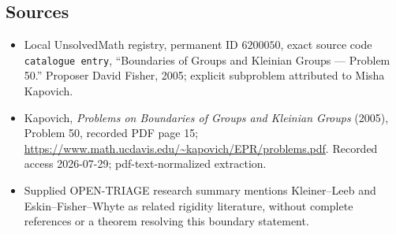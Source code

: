 \documentclass[11pt]{article}
\begin{document}
\subsection{Sources}
\begin{itemize}
\item Local UnsolvedMath registry, permanent ID \(6200050\), exact source code \texttt{catalogue entry}, ``Boundaries of Groups and Kleinian Groups --- Problem 50.'' Proposer David Fisher, 2005; explicit subproblem attributed to Misha Kapovich.
\item Kapovich, \emph{Problems on Boundaries of Groups and Kleinian Groups} (2005), Problem 50, recorded PDF page 15; \url{https://www.math.ucdavis.edu/~kapovich/EPR/problems.pdf}. Recorded access 2026-07-29; pdf-text-normalized extraction.
\item Supplied OPEN-TRIAGE research summary mentions Kleiner--Leeb and Eskin--Fisher--Whyte as related rigidity literature, without complete references or a theorem resolving this boundary statement.
\end{itemize}
\end{document}

